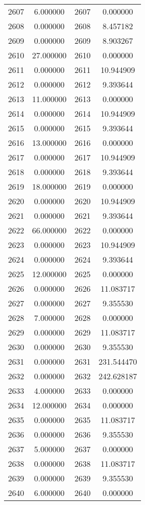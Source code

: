 \documentclass[12pt]{article}
\begin{document}
\begin{longtable}{@{}cccc@{}}
2607 & 6.000000 & 2607 & 0.000000 \\
2608 & 0.000000 & 2608 & 8.457182 \\
2609 & 0.000000 & 2609 & 8.903267 \\
2610 & 27.000000 & 2610 & 0.000000 \\
2611 & 0.000000 & 2611 & 10.944909 \\
2612 & 0.000000 & 2612 & 9.393644 \\
2613 & 11.000000 & 2613 & 0.000000 \\
2614 & 0.000000 & 2614 & 10.944909 \\
2615 & 0.000000 & 2615 & 9.393644 \\
2616 & 13.000000 & 2616 & 0.000000 \\
2617 & 0.000000 & 2617 & 10.944909 \\
2618 & 0.000000 & 2618 & 9.393644 \\
2619 & 18.000000 & 2619 & 0.000000 \\
2620 & 0.000000 & 2620 & 10.944909 \\
2621 & 0.000000 & 2621 & 9.393644 \\
2622 & 66.000000 & 2622 & 0.000000 \\
2623 & 0.000000 & 2623 & 10.944909 \\
2624 & 0.000000 & 2624 & 9.393644 \\
2625 & 12.000000 & 2625 & 0.000000 \\
2626 & 0.000000 & 2626 & 11.083717 \\
2627 & 0.000000 & 2627 & 9.355530 \\
2628 & 7.000000 & 2628 & 0.000000 \\
2629 & 0.000000 & 2629 & 11.083717 \\
2630 & 0.000000 & 2630 & 9.355530 \\
2631 & 0.000000 & 2631 & 231.544470 \\
2632 & 0.000000 & 2632 & 242.628187 \\
2633 & 4.000000 & 2633 & 0.000000 \\
2634 & 12.000000 & 2634 & 0.000000 \\
2635 & 0.000000 & 2635 & 11.083717 \\
2636 & 0.000000 & 2636 & 9.355530 \\
2637 & 5.000000 & 2637 & 0.000000 \\
2638 & 0.000000 & 2638 & 11.083717 \\
2639 & 0.000000 & 2639 & 9.355530 \\
2640 & 6.000000 & 2640 & 0.000000 \\

\end{longtable}
\end{document}
